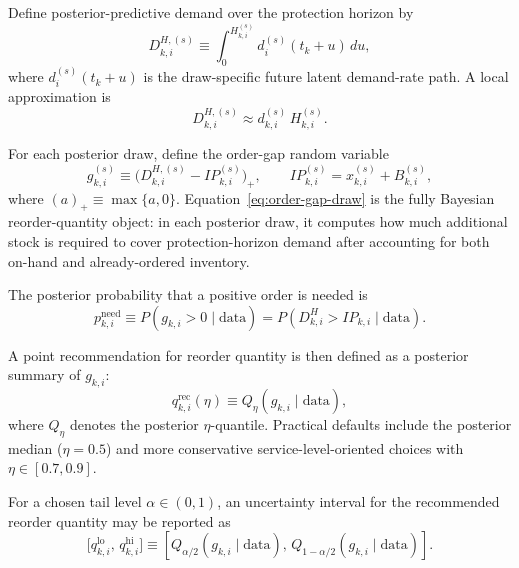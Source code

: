 \documentclass[11pt]{article}
\begin{document}
\begin{enumerate}
  Define posterior-predictive demand over the protection horizon by
  \begin{equation}\label{eq:protection-demand}
    D^{H,(s)}_{k,i}
    \equiv
    \int_{0}^{H^{(s)}_{k,i}} d^{(s)}_{i}(t_k+u)\,du,
  \end{equation}
  where $d^{(s)}_{i}(t_k+u)$ is the draw-specific future latent demand-rate path.
  A local approximation is
  \begin{equation}\label{eq:protection-demand-approx}
    D^{H,(s)}_{k,i} \approx d^{(s)}_{k,i}\,H^{(s)}_{k,i}.
  \end{equation}

  For each posterior draw, define the order-gap random variable
  \begin{equation}\label{eq:order-gap-draw}
    g^{(s)}_{k,i}
    \equiv
    \bigl(D^{H,(s)}_{k,i} - IP^{(s)}_{k,i}\bigr)_+,
    \qquad
    IP^{(s)}_{k,i}=x^{(s)}_{k,i}+B^{(s)}_{k,i},
  \end{equation}
  where $(a)_+ \equiv \max\{a,0\}$.
  Equation~\eqref{eq:order-gap-draw} is the fully Bayesian reorder-quantity object: in each posterior draw, it computes how much additional stock is required to cover protection-horizon demand after accounting for both on-hand and already-ordered inventory.

  The posterior probability that a positive order is needed is
  \begin{equation}\label{eq:order-need-prob}
    p^{\mathrm{need}}_{k,i}
    \equiv
    P\!\left(g_{k,i}>0 \mid \text{data}\right)
    =
    P\!\left(D^H_{k,i} > IP_{k,i} \mid \text{data}\right).
  \end{equation}

  A point recommendation for reorder quantity is then defined as a posterior summary of $g_{k,i}$:
  \begin{equation}\label{eq:reorder-quantity-rec}
    q^{\mathrm{rec}}_{k,i}(\eta)
    \equiv
    Q_{\eta}\!\left(g_{k,i}\mid\text{data}\right),
  \end{equation}
  where $Q_{\eta}$ denotes the posterior $\eta$-quantile.
  Practical defaults include the posterior median ($\eta=0.5$) and more conservative service-level-oriented choices with $\eta\in[0.7,0.9]$.

  For a chosen tail level $\alpha\in(0,1)$, an uncertainty interval for the recommended reorder quantity may be reported as
  \begin{equation}\label{eq:reorder-quantity-ci}
    \bigl[q^{\mathrm{lo}}_{k,i},\,q^{\mathrm{hi}}_{k,i}\bigr]
    \equiv
    \left[
      Q_{\alpha/2}\!\left(g_{k,i}\mid\text{data}\right),\,
      Q_{1-\alpha/2}\!\left(g_{k,i}\mid\text{data}\right)
    \right].
  \end{equation}


\end{enumerate}
\end{document}
